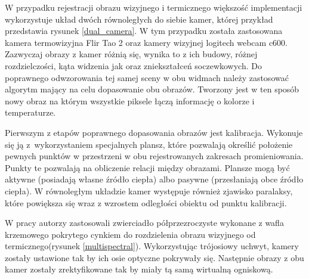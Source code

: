 W przypadku rejestracji obrazu wizyjnego i termicznego większość implementacji wykorzystuje układ dwóch równoległych do siebie kamer, której przykład przedstawia rysunek \ref{dual_camera}. W tym przypadku została zastosowana kamera termowizyjna Flir Tao 2 oraz kamery wizyjnej logitech webcam c600. %
Zazwyczaj obrazy z kamer różnią się, wynika to z ich budowy, różnej rozdzielczości, kąta widzenia jak oraz zniekształceń soczewkowych.
Do poprawnego odwzorowania tej samej sceny w obu widmach należy zastosować algorytm mający na celu dopasowanie obu obrazów. Tworzony jest w ten sposób nowy obraz na którym wszystkie piksele łączą informację o kolorze i temperaturze.

Pierwszym z etapów poprawnego dopasowania obrazów jest kalibracja.
Wykonuje się ją z~wykorzystaniem specjalnych plansz, które pozwalają określić położenie pewnych punktów w przestrzeni w obu rejestrowanych zakresach promieniowania. 
Punkty te pozwalają na obliczenie relacji między obrazami. 
Plansze mogą być aktywne (posiadają własne źródło ciepła) albo pasywne (przesłaniają obce źródło ciepła). 
W równoległym układzie kamer występuje również zjawisko paralaksy, które powiększa się wraz z wzrostem odległości obiektu od punktu kalibracji. 

W pracy \cite{hwang2015multispectral} autorzy zastosowali zwierciadło półprzezroczyste wykonane z wafla krzemowego pokrytego cynkiem do rozdzielenia obrazu wizyjnego od termicznego(rysunek \ref{multispectral}). Wykorzystując trójosiowy uchwyt, kamery zostały ustawione tak by ich osie optyczne pokrywały się. Następnie obrazy z obu kamer zostały zrektyfikowane tak by miały tą samą wirtualną ogniskową.

